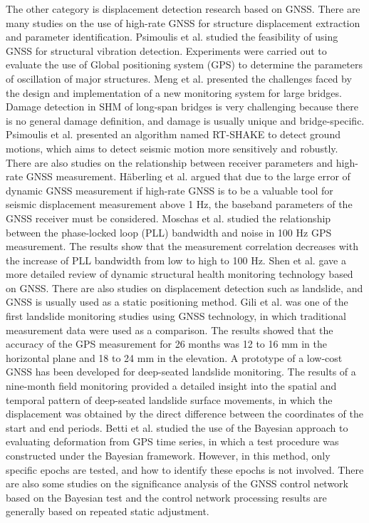 \documentclass[final,3p,times]{elsarticle}
\begin{document}
	\textcolor{r_s}{
	The other category is displacement detection research based on GNSS.
	There are many studies on the use of high-rate GNSS for structure displacement extraction and parameter identification.
	Psimoulis et al.\cite{psimoulis2008_1,psimoulis2008_2} studied the feasibility of using GNSS for structural vibration detection. Experiments were carried out to evaluate the use of Global positioning system (GPS) to determine the parameters of oscillation of major structures.
	Meng et al.\cite{Meng_2018} presented the challenges faced by the design and implementation of a new monitoring system for large bridges. Damage detection in SHM of long-span bridges is very challenging because there is no general damage definition, and damage is usually unique and bridge-specific. Psimoulis et al.\cite{psimoulis2018detection} presented an algorithm named RT-SHAKE to detect ground motions, which aims to detect seismic motion more sensitively and robustly.	There are also studies on the relationship between receiver parameters and high-rate GNSS measurement\cite{Hberling2015,Moschas2015}.
	H{\"a}berling et al.\cite{Hberling2015} argued that due to the large error of dynamic GNSS measurement if high-rate GNSS is to be a valuable tool for seismic displacement measurement above 1 Hz, the baseband parameters of the GNSS receiver must be considered.
	Moschas et al.\cite{Moschas2015} studied the relationship between the phase-locked loop (PLL) bandwidth and noise in 100 Hz GPS measurement.
	The results show that the measurement correlation decreases with the increase of PLL bandwidth from low to high to 100 Hz. Shen et al.\cite{shennan_2019} gave a more detailed review of dynamic structural health monitoring technology based on GNSS. There are also studies on displacement detection such as landslide, and GNSS is usually used as a static positioning method.}
	Gili et al.\cite{gili2000using} was one of the first landslide monitoring studies using GNSS technology, in which traditional measurement data were used as a comparison. 
	The results showed that the accuracy of the GPS measurement \textcolor{r_s}{for} 26 months was 12 to 16 mm in the horizontal plane and 18 to 24 mm in the elevation.
	A prototype of a low-cost GNSS has been developed for deep-seated landslide monitoring\cite{rs12203375}. 
	The results of a nine-month field monitoring provided a detailed insight into the spatial and temporal pattern of deep-seated landslide surface movements, in which the displacement was obtained by the direct difference between the coordinates of the start and end periods.
	\textcolor{r_s}{
		Betti et al.\cite{betti2001deformation,betti2011deformation} studied the use of the Bayesian approach to evaluating deformation from GPS time series, in which a test procedure was constructed under the Bayesian framework. However, in this method, only specific epochs are tested, and how to identify these epochs is not involved.
		There are also some studies on the significance analysis of the GNSS control network based on the Bayesian test and the control network processing results are generally based on repeated static adjustment.
	}
	
\end{document}
